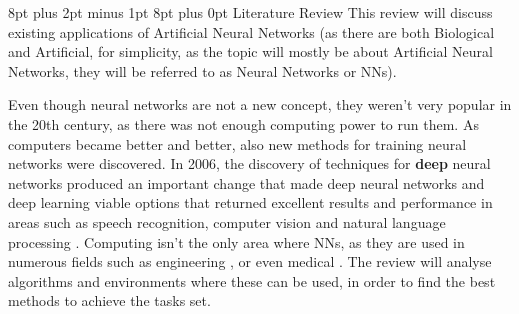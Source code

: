 \documentclass[12pt,a4paper]{article}
\makeatletter
\renewcommand\section{\@startsection {section}{1}{0mm} %
                               {8pt plus 2pt minus 1pt} %
                               {8pt plus 0pt} %
                               {\bfseries}}
\makeatother
\begin{document}
\section{Literature Review}
This review will discuss existing applications of Artificial Neural Networks (as there are both Biological and Artificial, for simplicity, as the topic will mostly be about Artificial Neural Networks, they will be referred to as Neural Networks or NNs).\par
Even though neural networks are not a new concept, they weren’t very popular in the 20th century, as there was not enough computing power to run them. As computers became better and better, also new methods for training neural networks were discovered. In 2006, the discovery of techniques for \textbf{deep} neural networks produced an important change that made deep neural networks and deep learning viable options that returned excellent results and performance in areas such as speech recognition, computer vision and natural language processing  \cite{nielsen_neural_2018}.
Computing isn’t the only area where NNs, as they are used in numerous fields such as engineering \cite{aydinalp-koksal_comparison_2008}, or even medical \cite{baxt_use_1991}.
The review will analyse algorithms and environments where these can be used, in order to find the best methods to achieve the tasks set.
\end{document}
